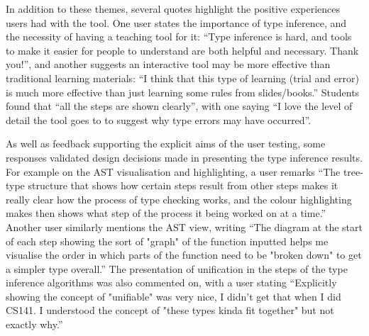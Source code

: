 \documentclass[a4paper,fleqn,oneside,12pt]{report}
\begin{document}
In addition to these themes, several quotes highlight the positive experiences users had with the tool. One user states the importance of type inference, and the necessity of having a teaching tool for it: “Type inference is hard, and tools to make it easier for people to understand are both helpful and necessary. Thank you!”, and another suggests an interactive tool may be more effective than traditional learning materials: “I think that this type of learning (trial and error) is much more effective than just learning some rules from slides/books.” Students found that “all the steps are shown clearly”, with one saying “I love the level of detail the tool goes to to suggest why type errors may have occurred”.

As well as feedback supporting the explicit aims of the user testing, some responses validated design decisions made in presenting the type inference results. For example on the AST visualisation and highlighting, a user remarks “The tree-type structure that shows how certain steps result from other steps makes it really clear how the process of type checking works, and the colour highlighting makes then shows what step of the process it being worked on at a time.” Another user similarly mentions the AST view, writing “The diagram at the start of each step showing the sort of "graph" of the function inputted helps me visualise the order in which parts of the function need to be "broken down" to get a simpler type overall.” The presentation of unification in the steps of the type inference algorithms was also commented on, with a user stating “Explicitly showing the concept of "unifiable" was very nice, I didn't get that when I did CS141. I understood the concept of "these types kinda fit together" but not exactly why.”
\end{document}
